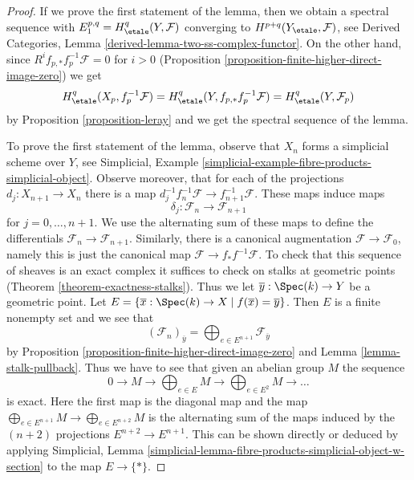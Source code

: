 \begin{proof}
If we prove the first statement of the lemma, then we obtain a spectral
sequence with $E_1^{p, q} = H^q_\etale(Y, \mathcal{F})$ converging
to $H^{p + q}(Y_\etale, \mathcal{F})$, see
Derived Categories, Lemma \ref{derived-lemma-two-ss-complex-functor}.
On the other hand, since
$R^if_{p, *}f_p^{-1}\mathcal{F} = 0$ for $i > 0$
(Proposition \ref{proposition-finite-higher-direct-image-zero})
we get
$$
H^q_\etale(X_p, f_p^{-1}\mathcal{F}) =
H^q_\etale(Y, f_{p, *}f_p^{-1} \mathcal{F}) =
H^q_\etale(Y, \mathcal{F}_p)
$$
by Proposition \ref{proposition-leray}
and we get the spectral sequence of the lemma.

\medskip\noindent
To prove the first statement of the lemma, observe that
$X_n$ forms a simplicial scheme over $Y$, see
Simplicial, Example \ref{simplicial-example-fibre-products-simplicial-object}.
Observe moreover, that for each of the projections
$d_j : X_{n + 1} \to X_n$ there is a map
$d_j^{-1} f_n^{-1}\mathcal{F} \to f_{n + 1}^{-1}\mathcal{F}$.
These maps induce maps
$$
\delta_j : \mathcal{F}_n \to \mathcal{F}_{n + 1}
$$
for $j = 0, \ldots, n + 1$. We use the alternating sum of these maps
to define the differentials $\mathcal{F}_n \to \mathcal{F}_{n + 1}$.
Similarly, there is a canonical augmentation $\mathcal{F} \to \mathcal{F}_0$,
namely this is just the canonical map $\mathcal{F} \to f_*f^{-1}\mathcal{F}$.
To check that this sequence of sheaves is an exact complex it suffices
to check on stalks at geometric points (Theorem \ref{theorem-exactness-stalks}).
Thus we let $\overline{y} : \Spec(k) \to Y$ be a geometric point. Let
$E = \{\overline{x} : \Spec(k) \to X \mid f(\overline{x}) = \overline{y}\}$.
Then $E$ is a finite nonempty set and we see that
$$
(\mathcal{F}_n)_{\overline{y}} =
\bigoplus\nolimits_{e \in E^{n + 1}} \mathcal{F}_{\overline{y}}
$$
by Proposition \ref{proposition-finite-higher-direct-image-zero}
and Lemma \ref{lemma-stalk-pullback}.
Thus we have to see that given an abelian group $M$ the sequence
$$
0 \to M \to \bigoplus\nolimits_{e \in E} M \to
\bigoplus\nolimits_{e \in E^2} M \to \ldots
$$
is exact. Here the first map is the diagonal map and the map
$\bigoplus_{e \in E^{n + 1}} M  \to \bigoplus_{e \in E^{n + 2}} M$
is the alternating sum of the maps induced by the $(n + 2)$
projections $E^{n + 2} \to E^{n + 1}$. This can be shown directly
or deduced by applying Simplicial, Lemma
\ref{simplicial-lemma-fibre-products-simplicial-object-w-section}
to the map $E \to \{*\}$.
\end{proof}

